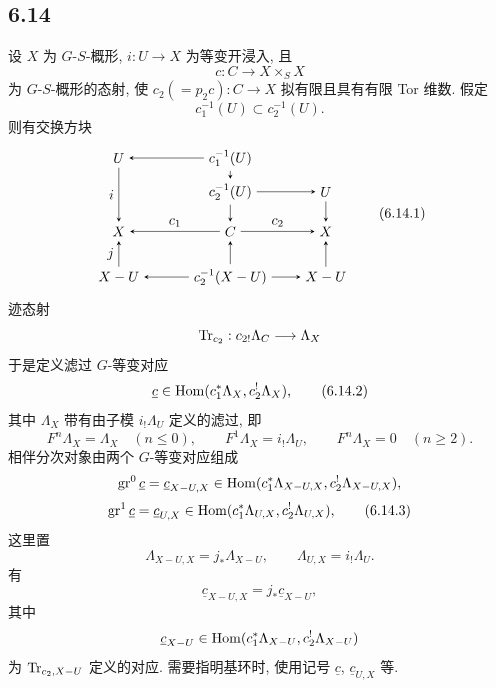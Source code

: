 \subsection*{6.14}
设 $X$ 为 $G$-$S$-概形, $i:U\to X$ 为等变开浸入, 且
\[
c:C\to X\times_SX
\]
为 $G$-$S$-概形的态射, 使 $c_2(=p_2c):C\to X$ 拟有限且具有有限 Tor 维数. 假定
\[
c_1^{-1}(U)\subset c_2^{-1}(U).
\]
则有交换方块
\begin{equation}
\begin{tikzpicture}[baseline=(current bounding box.center),>=stealth]
\node (U1) at (0,3.0) {$U$};
\node (C1U) at (2.8,3.0) {$c_1^{-1}(U)$};
\node (C2U) at (2.8,2.15) {$c_2^{-1}(U)$};
\node (U2) at (5.2,2.15) {$U$};
\node (X1) at (0,1.15) {$X$};
\node (C) at (2.8,1.15) {$C$};
\node (X2) at (5.2,1.15) {$X$};
\node (XU1) at (0,0) {$X-U$};
\node (C2XU) at (2.8,0) {$c_2^{-1}(X-U)$};
\node (XU2) at (5.2,0) {$X-U$};
\draw[->] (C1U) -- (U1);
\draw[->] (C1U) -- (C2U);
\draw[->] (C2U) -- (U2);
\draw[->] (U1) -- node[left] {$i$} (X1);
\draw[->] (U2) -- (X2);
\draw[->] (C2U) -- (C);
\draw[->] (C2XU) -- (C);
\draw[->] (C) -- node[above] {$c_1$} (X1);
\draw[->] (C) -- node[above] {$c_2$} (X2);
\draw[->] (XU1) -- node[left] {$j$} (X1);
\draw[->] (XU2) -- (X2);
\draw[->] (C2XU) -- (XU1);
\draw[->] (C2XU) -- (XU2);
\end{tikzpicture}
\tag{6.14.1}
\end{equation}
迹态射
\[
\operatorname{Tr}_{c_2}:c_{2!}\Lambda_C\longrightarrow \Lambda_X
\]
于是定义滤过 $G$-等变对应
\begin{equation}
\underline c\in\operatorname{Hom}(c_1^*\Lambda_X,c_2^!\Lambda_X),
\tag{6.14.2}
\end{equation}
其中 $\Lambda_X$ 带有由子模 $i_!\Lambda_U$ 定义的滤过, 即
\[
F^n\Lambda_X=\Lambda_X\quad(n\le0),\qquad
F^1\Lambda_X=i_!\Lambda_U,\qquad
F^n\Lambda_X=0\quad(n\ge2).
\]
相伴分次对象由两个 $G$-等变对应组成
\[
\operatorname{gr}^0\underline c=\underline c_{X-U,X}
\in\operatorname{Hom}(c_1^*\Lambda_{X-U,X},c_2^!\Lambda_{X-U,X}),
\]
\begin{equation}
\operatorname{gr}^1\underline c=\underline c_{U,X}
\in\operatorname{Hom}(c_1^*\Lambda_{U,X},c_2^!\Lambda_{U,X}),
\tag{6.14.3}
\end{equation}
这里置
\[
\Lambda_{X-U,X}=j_*\Lambda_{X-U},\qquad
\Lambda_{U,X}=i_!\Lambda_U.
\]
有
\begin{equation}
\underline c_{X-U,X}=j_*\underline c_{X-U},
\tag{6.14.4}
\end{equation}
其中
\[
\underline c_{X-U}\in\operatorname{Hom}(c_1^*\Lambda_{X-U},c_2^!\Lambda_{X-U})
\]
为 $\operatorname{Tr}_{c_2,X-U}$ 定义的对应. 需要指明基环时, 使用记号 $\underline c$, $\underline c_{U,X}$ 等.


